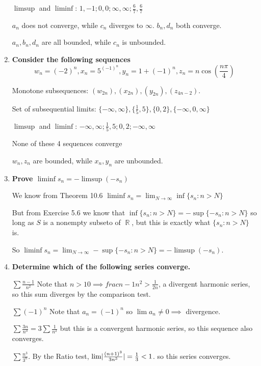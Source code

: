 \documentclass[10pt,a4paper]{article}
\DeclareMathOperator*{\R}{\mathbb{R}}
\DeclarePairedDelimiter{\abs}{\lvert}{\rvert}
\begin{document}
\begin{enumerate}
        $\limsup$ and $\liminf$: $1,-1; 0, 0; \infty, \infty; \frac{6}{7}, \frac{6}{7}$

        $a_n$ does not converge, while $c_n$ diverges to $\infty$. $b_n, d_n$ both converge.

        $a_n, b_n, d_n$ are all bounded, while $c_n$ is unbounded.

    \item \textbf{Consider the following sequences $$w_n = (-2)^n, x_n = 5^{(-1)^n}, y_n = 1 + (-1)^n, z_n = n \cos \left(\frac{n\pi}{4} \right) $$}

        Monotone subsequences: $(w_{2n}), (x_{2n}), (y_{2n} ), (z_{4n-2})$.

        Set of subsequential limits: $\{-\infty, \infty\}, \{\frac{1}{5}, 5\}, \{0, 2\}, \{ -\infty, 0, \infty\}$

        $\limsup$ and $\liminf$: $-\infty, \infty; \frac{1}{5}, 5; 0,2 ; -\infty, \infty$

        None of these 4 sequences converge

        $w_n, z_n$ are bounded, while $x_n, y_n$ are unbounded.

    \item \textbf{Prove $\liminf s_n = -\limsup (-s_n)$}

        We know from Theorem 10.6 $\liminf s_n = \lim_{N \to \infty}  \inf \{ s_n: n > N\}$

        But from Exercise 5.6 we know that $\inf \{ s_n: n > N\} = - \sup \{-s_n : n > N\}$ so long as $S$ is a nonempty subseto of $\R$, but this is exactly what $\{ s_n: n > N\}$ is.

        So $\liminf s_n = \lim_{N \to \infty} - \sup \{-s_n : n > N\} = - \limsup (-s_n)$.
        
    \item \textbf{Determine which of the following series converge.}

        $\sum \frac{n-1}{n^2}$ Note that $n> 10 \implies frac{n-1}{n^2} > \frac{1}{2n}$, a divergent harmonic series, so this sum diverges by the comparison test.

        $\sum (-1)^n$ Note that $a_n = (-1)^n$ so $\lim a_n \neq 0 \implies$ divergence.

        $\sum \frac{3n}{n^3}  = 3 \sum \frac{1}{n^2}$ but this is a convergent harmonic series, so this sequence also converges. 

        $\sum {\frac{n^3}{3^n}}$. By the Ratio test, $\lim \abs{\frac{(n+1)^3}{3n^3}} = \frac{1}{3} < 1$. so this series converges.


\end{enumerate}
\end{document}
